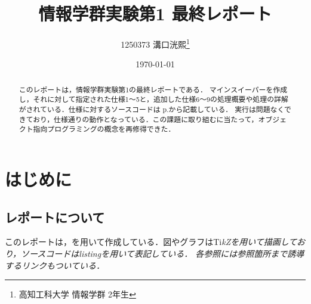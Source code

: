\documentclass[a4j,11pt]{jsarticle}
\title{\vspace{0cm}情報学群実験第1 最終レポート}
\author{1250373 溝口洸熙\thanks{高知工科大学 情報学群 2年生}}
\date{\today}
\begin{document}
\maketitle

\begin{abstract}
    このレポートは，情報学群実験第1の最終レポートである．
    マインスイーパーを作成し，それに対して指定された仕様1〜5と，追加した仕様6〜9の処理概要や処理の詳解がされている．仕様に対するソースコードは p.\pageref{sec:ソースコード}から記載している．
    実行は問題なくできており，仕様通りの動作となっている．この課題に取り組むに当たって，オブジェクト指向プログラミングの概念を再修得できた．
\end{abstract}
\newpage
\tableofcontents
\newpage
\section*{はじめに}
\subsection*{レポートについて}
このレポートは，\LaTeXe を用いて作成している．図やグラフはTi\it{k}\normalfont Zを用いて描画しており，ソースコードはlistingを用いて表記している．
各参照には参照箇所まで誘導するリンクもついている．
\end{document}

